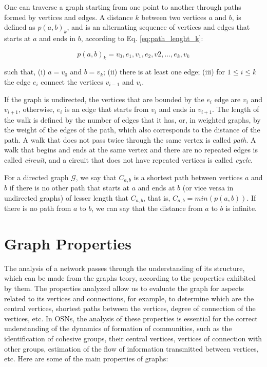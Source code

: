 One can traverse a graph starting from one point to another through paths formed by vertices and edges. A distance $k$ between two vertices $a$ and $b$, is defined as $p(a,b)_k$, and is an alternating sequence of vertices and edges that starts at $a$ and ends in $b$, according to Eq. \ref{eq:path_lenght_k}:

\begin{equation}
    \label{eq:path_lenght_k}
    p(a,b)_k = v_0,e_1,v_1,e_2,v2,...,e_k,v_k
\end{equation}

such that, (i) $a=v_0$ and $b=v_k$; (ii) there is at least one edge; (iii) for $1 \leq i \leq k$ the edge $e_i$ connect the vertices $v_{i-1}$ and $v_i$.


If the graph is undirected, the vertices that are bounded by the $e_i$ edge are $v_i$ and $v_{i+1}$, otherwise, $e_i$ is an edge that starts from $v_i$ and ends in $v_{i+1}$. The length of the walk is defined by the number of edges that it has, or, in weighted graphs, by the weight of the edges of the path, which also corresponds to the distance of the path. A walk that does not pass twice through the same vertex is called {\em path}. A walk that begins and ends at the same vertex and there are no repeated edges is called {\em circuit}, and a circuit that does not have repeated vertices is called {\em cycle}.

For a directed graph $\mathcal{G}$, we say that $C_{a,b}$ is a shortest path between vertices $a$ and $b$ if there is no other path that starts at $a$ and ends at $b$ (or vice versa in undirected graphs) of lesser length that $C_{a,b}$, that is, $C_{a,b}= min(p(a,b))$. If there is no path from $a$ to $b$, we can say that the distance from $a$ to $b$ is infinite.



\section{Graph Properties}
\label{sec:graph_properties}
The analysis of a network passes through the understanding of its structure, which can be made from the graphs teory, according to the properties exhibited by them. The properties analyzed allow us to evaluate the graph for aspects related to its vertices and connections, for example, to determine which are the central vertices, shortest paths between the vertices, degree of connection of the vertices, etc. In OSNs, the analysis of these properties is essential for the correct understanding of the dynamics of formation of communities, such as the identification of cohesive groups, their central vertices, vertices of connection with other groups, estimation of the flow of information transmitted between vertices, etc. Here are some of the main properties of graphs:

